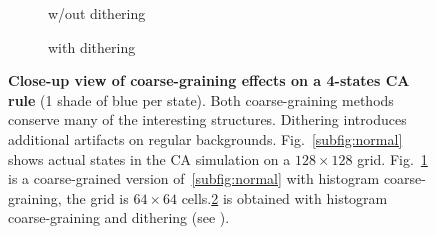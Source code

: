 \begin{figure}[th]
\begin{subfigure}{.32\linewidth}
    \caption{\label{subfig:no-dithering}w/out dithering}
  \end{subfigure}
  \hfill
  \begin{subfigure}{.32\linewidth}
    \caption{\label{subfig:dithering}with dithering}
  \end{subfigure}

  \caption{\label{fig:close-up}\textbf{Close-up view of coarse-graining effects
      on a 4-states CA rule} (1 shade of blue per state). Both coarse-graining
    methods conserve many of the interesting structures. Dithering introduces
    additional artifacts on regular backgrounds. Fig.~\ref{subfig:normal} shows
    actual states in the CA simulation on a $128 \times 128$ grid.
    Fig.~\ref{subfig:no-dithering} is a coarse-grained version
    of~\ref{subfig:normal} with histogram coarse-graining, the grid is $64
    \times 64$ cells.\ref{subfig:dithering} is obtained with histogram
    coarse-graining and dithering (see ).}
\end{figure}


